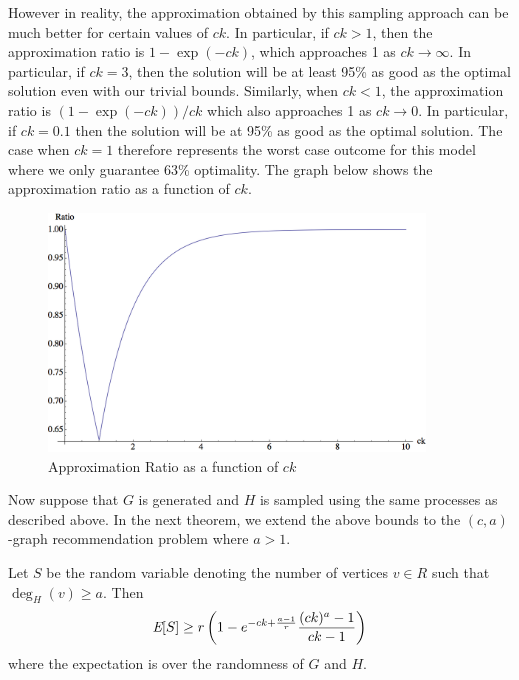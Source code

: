 However in reality, the approximation obtained by this sampling
approach can be much better for certain values of $ck$. In particular,
if $ck>1$, then the approximation ratio is $1-\exp(-ck)$, which
approaches 1 as $ck\to\infty$. In particular, if $ck=3$, then the
solution will be at least 95\% as good as the optimal solution even
with our trivial bounds. Similarly, when $ck<1$, the approximation
ratio is $(1-\exp(-ck))/ck$ which also approaches 1 as $ck\to 0$. In
particular, if $ck=0.1$ then the solution will be at 95\% as good as
the optimal solution. The case when $ck=1$ therefore represents the
worst case outcome for this model where we only guarantee 63\%
optimality. The graph below shows the approximation ratio as a
function of $ck$.

\begin{figure}[h]
\centering
\includegraphics[width=10cm]{Sri_Original.png}
\caption{Approximation Ratio as a function of $ck$ }
\end{figure}

Now suppose that $G$ is generated and $H$ is sampled using the same
processes as described above. In the next theorem, we extend the above
bounds to the $(c,a)$-graph recommendation problem where $a>1$. 

\begin{thm}
Let $S$ be the random variable denoting the number of vertices $v \in R$ such that $\deg_{H}(v)\geq a$. Then
\[ \emph{\text{E}}[S] \geq r\left(1-e^{-ck+\frac{a-1}{r}}\frac{(ck)^a-1}{ck-1}\right)  \]
where the expectation is over the randomness of $G$ and $H$.
\end{thm}

